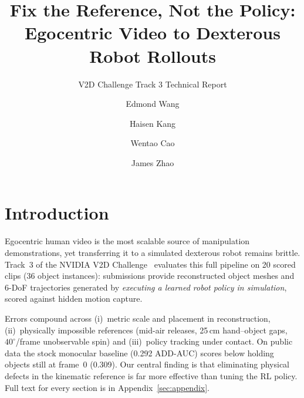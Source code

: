 \documentclass[10pt]{nvidiaextabstract}
\title{Fix the Reference, Not the Policy: Egocentric Video to Dexterous Robot Rollouts}
\subtitle{V2D Challenge Track 3 Technical Report}
\author[1*]{Edmond Wang}
\author[1*]{Haisen Kang}
\author[1*]{Wentao Cao}
\author[1*]{James Zhao}
\author[1]{\todo{Add remaining authors or remove}}
\affil[1]{Carnegie Mellon University}
\affil[ ]{\texttt{\{edmondwa, haisenk, wentaoc, jameszh2\}@andrew.cmu.edu}}
\begin{document}
\maketitle

\section{Introduction}
\label{sec:intro}

Egocentric human video is the most scalable source of manipulation demonstrations, yet transferring it to a simulated dexterous robot remains brittle. Track~3 of the NVIDIA V2D Challenge~\cite{v2d,v2ddata} evaluates this full pipeline on 20 scored clips (36 object instances): submissions provide reconstructed object meshes and 6-DoF trajectories generated by \emph{executing a learned robot policy in simulation}, scored against hidden motion capture.

Errors compound across (i)~metric scale and placement in reconstruction, (ii)~physically impossible references (mid-air releases, 25\,cm hand--object gaps, $40^\circ$/frame unobservable spin) and (iii)~policy tracking under contact. On public data the stock monocular baseline (0.292 ADD-AUC) scores below holding objects still at frame~0 (0.309). Our central finding is that eliminating physical defects in the kinematic reference is far more effective than tuning the RL policy. Full text for every section is in Appendix~\ref{sec:appendix}.
\end{document}
